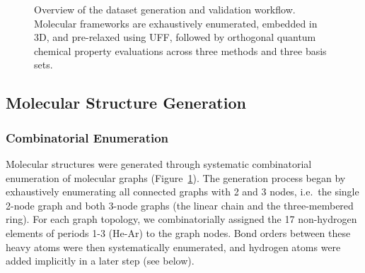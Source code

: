 \documentclass[fleqn,10pt]{article}
\begin{document}
\begin{figure}[htbp]
{%
}
\caption{Overview of the dataset generation and validation workflow. Molecular frameworks are exhaustively enumerated, embedded in 3D, and pre-relaxed using UFF, followed by orthogonal quantum chemical property evaluations across three methods and three basis sets.}
\label{fig:workflow_flowchart}
\end{figure}


\subsection*{Molecular Structure Generation}

\subsubsection*{Combinatorial Enumeration}

Molecular structures were generated through systematic combinatorial enumeration of molecular graphs (Figure~\ref{fig:workflow_flowchart}). The generation process began by exhaustively enumerating all connected graphs with 2 and 3 nodes, i.e.\ the single 2-node graph and both 3-node graphs (the linear chain and the three-membered ring). For each graph topology, we combinatorially assigned the 17 non-hydrogen elements of periods 1-3 (He-Ar) to the graph nodes. Bond orders between these heavy atoms were then systematically enumerated, and hydrogen atoms were added implicitly in a later step (see below).
\end{document}
